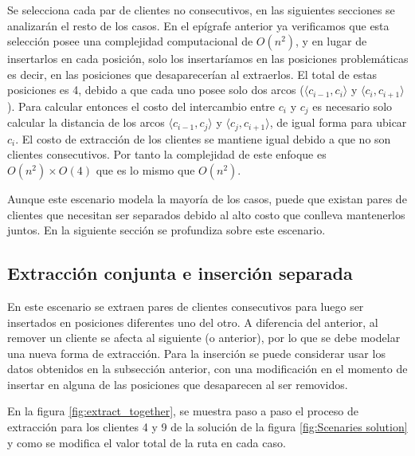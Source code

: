 \documentclass{article}
\begin{document}
Se selecciona cada par de clientes no consecutivos, en las siguientes secciones se analizarán el resto de los casos. En el epígrafe anterior ya verificamos que esta selección posee una complejidad computacional de $O(n^2)$, y en lugar de insertarlos en cada posición, solo los insertaríamos en las posiciones problemáticas es decir, en las posiciones que desaparecerían al extraerlos. El total de estas posiciones es 4, debido a que cada uno posee solo dos arcos ($\langle c_{i-1},c_i \rangle$ y $\langle c_i,c_{i+1} \rangle$). Para calcular entonces el costo del intercambio entre $c_i$ y $c_j$ es necesario solo calcular la distancia de los arcos $\langle c_{i-1},c_j \rangle$ y $\langle c_j,c_{i+1} \rangle$, de igual forma para ubicar $c_i$. El costo de extracción de los clientes se mantiene igual debido a que no son clientes consecutivos. Por tanto la complejidad de este enfoque es $O(n^2)\times O(4)$ que es lo mismo que $O(n^2)$.

Aunque este escenario modela la mayoría de los casos, puede que existan pares de clientes que necesitan ser separados debido al alto costo que conlleva mantenerlos juntos. En la siguiente sección se profundiza sobre este escenario.

\subsection{Extracción conjunta e inserción separada}

En este escenario se extraen pares de clientes consecutivos para luego ser insertados en posiciones diferentes uno del otro. A diferencia del anterior, al remover un cliente se afecta al siguiente (o anterior), por lo que se debe modelar una nueva forma de extracción. Para la inserción se puede considerar usar los datos obtenidos en la subsección anterior, con una modificación en el momento de insertar en alguna de las posiciones que desaparecen al ser removidos.

En la figura \ref{fig:extract_together}, se muestra paso a paso el proceso de extracción para los clientes 4 y 9 de la solución de la figura \ref{fig:Scenaries solution} y como se modifica el valor total de la ruta en cada caso.
\end{document}
